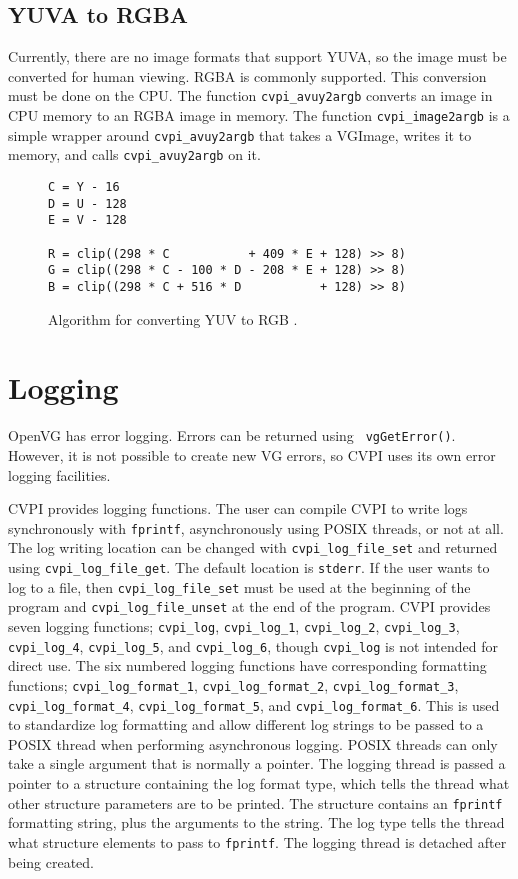 \documentclass[12pt]{report}
\begin{document}
\section{YUVA to RGBA}
\label{sec-3-15}
Currently, there are no image formats that support YUVA, so the
image must be converted for human viewing.  RGBA is commonly
supported. This conversion must be done on the CPU.
The function {\tt cvpi\_avuy2argb} converts an image in CPU memory to an
RGBA image in memory. The function {\tt cvpi\_image2argb} is a simple
wrapper around {\tt cvpi\_avuy2argb} that takes a VGImage, writes it
to memory, and calls {\tt cvpi\_avuy2argb} on it.
\begin{figure}[H]
\begin{mdframed}[style=default]
\begin{lstlisting}
C = Y - 16
D = U - 128
E = V - 128

R = clip((298 * C           + 409 * E + 128) >> 8)
G = clip((298 * C - 100 * D - 208 * E + 128) >> 8)
B = clip((298 * C + 516 * D           + 128) >> 8)
\end{lstlisting}
\end{mdframed}
\caption{Algorithm for converting YUV to RGB \cite{yuv2rgb}.}
\end{figure}
\chapter{Logging}
\label{sec-5}
OpenVG has error logging. Errors can be returned using {\tt
  vgGetError()}. However, it is not possible to create new VG errors,
so CVPI uses its own error logging facilities.

CVPI provides logging functions. The user can compile CVPI to write
logs synchronously with {\tt fprintf}, asynchronously using POSIX
threads, or not at all. The log writing location can be changed with
{\tt cvpi\_log\_file\_set} and returned using {\tt cvpi\_log\_file\_get}. The
default location is {\tt stderr}. If the user wants to log to a file,
then {\tt cvpi\_log\_file\_set} must be used at the beginning of the
program and {\tt cvpi\_log\_file\_unset} at the end of the program. CVPI
provides seven logging functions; {\tt cvpi\_log}, {\tt cvpi\_log\_1},
{\tt cvpi\_log\_2}, {\tt cvpi\_log\_3}, {\tt cvpi\_log\_4}, {\tt cvpi\_log\_5}, and
{\tt cvpi\_log\_6}, though {\tt cvpi\_log} is not intended for direct use. The
six numbered logging functions have corresponding formatting
functions; {\tt cvpi\_log\_format\_1}, {\tt cvpi\_log\_format\_2},
{\tt cvpi\_log\_format\_3}, {\tt cvpi\_log\_format\_4}, {\tt cvpi\_log\_format\_5}, and
{\tt cvpi\_log\_format\_6}. This is used to standardize log formatting and
allow different log strings to be passed to a POSIX thread when
performing asynchronous logging. POSIX threads can only take a
single argument that is normally a pointer. The logging thread is
passed a pointer to a structure containing the log format type,
which tells the thread what other structure parameters are to be
printed. The structure contains an {\tt fprintf} formatting string, plus
the arguments to the string. The log type tells the thread what
structure elements to pass to {\tt fprintf}. The logging thread is
detached after being created.
\end{document}
